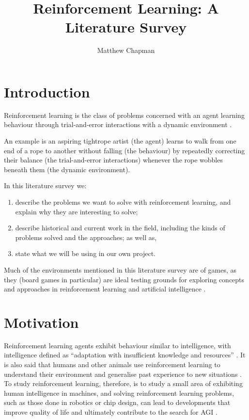 \documentclass{article}
\title{Reinforcement Learning: A Literature Survey}
\author{Matthew Chapman}
\begin{document}
\maketitle

\section{Introduction}
Reinforcement learning is the class of problems concerned with an agent learning behaviour through trial-and-error interactions with a dynamic environment \cite{Kaelbling1996}.

An example is an aspiring tightrope artist (the agent) learns to walk
from one end of a rope to another without falling (the behaviour) by
repeatedly correcting their balance (the trial-and-error interactions) whenever the rope wobbles beneath them (the dynamic environment).

In this literature survey we: 
\begin{enumerate}
  \item{describe the problems we want to solve with reinforcement learning, and explain why they are interesting to solve;} 
  \item{describe historical and current work in the field, including the kinds of problems solved and the approaches; as well as,} 
  \item{state what we will be using in our own project.}
\end{enumerate}

Much of the environments mentioned in this literature survey are of games, as they (board games in particular) are ideal testing grounds for exploring concepts and approaches in reinforcement learning and artificial intelligence \cite{Tesauro1995}.

\section{Motivation}
Reinforcement learning agents exhibit behaviour similar to intelligence, with intelligence defined as ``adaptation with insufficient knowledge and resources'' \cite{OnDefiningArtificialIntelligence}. It is also said that humans and other animals use reinforcement learning to understand their environment and generalise past experience to new situations \cite{Mnih2015}. To study reinforcement learning, therefore, is to study a small area of exhibiting human intelligence in machines, and solving reinforcement learning problems, such as those done in robotics or chip design, can lead to developments that improve quality of life and ultimately contribute to the search for AGI \cite{Ipek2008, Kober2013}.
\end{document}
